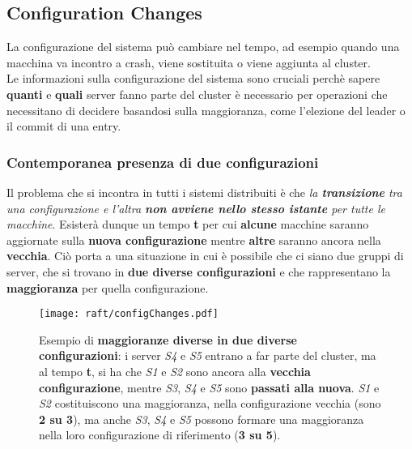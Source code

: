\subsection{Configuration Changes}
La configurazione del sistema può cambiare nel tempo, ad esempio quando una macchina va incontro a crash, viene sostituita o viene aggiunta al cluster.\\

Le informazioni sulla configurazione del sistema sono cruciali perchè sapere \textbf{quanti} e \textbf{quali} server fanno parte del cluster è necessario per operazioni che necessitano di decidere basandosi sulla maggioranza, come l'elezione del leader o il commit di una entry.\\

\subsubsection{Contemporanea presenza di due configurazioni}
  Il problema che si incontra in tutti i sistemi distribuiti è che \textit{la \textbf{transizione} tra una configurazione e l'altra \textbf{non avviene nello stesso istante} per tutte le macchine}. Esisterà dunque un tempo \textbf{t} per cui \textbf{alcune} macchine saranno aggiornate sulla \textbf{nuova configurazione} mentre \textbf{altre} saranno ancora nella \textbf{vecchia}. Ciò porta a una situazione in cui è possibile che ci siano due gruppi di server, che si trovano in \textbf{due diverse configurazioni} e che rappresentano la \textbf{maggioranza} per quella configurazione.\\

  \begin{figure}[H]
    \centering
    \texttt{[image: raft/configChanges.pdf]}
    \caption{Esempio di \textbf{maggioranze diverse in due diverse configurazioni}: i server \textit{S4} e \textit{S5} entrano a far parte del cluster, ma al tempo \textbf{t}, si ha che \textit{S1} e \textit{S2} sono ancora alla \textbf{vecchia configurazione}, mentre \textit{S3}, \textit{S4} e \textit{S5} sono \textbf{passati alla nuova}.
    \textit{S1} e \textit{S2} costituiscono una maggioranza, nella configurazione vecchia (sono \textbf{2 su 3}), ma anche \textit{S3}, \textit{S4} e \textit{S5} possono formare una maggioranza nella loro configurazione di riferimento (\textbf{3 su 5}). }
    \label{fig:figure 8}
  \end{figure}

